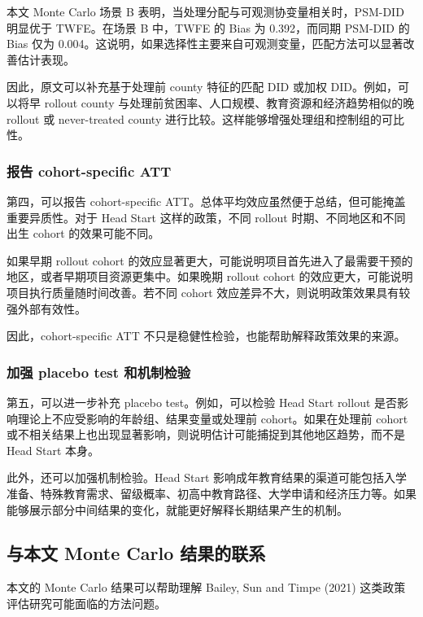 \documentclass[
  fontset=windows]{ctexart}
\begin{document}
本文 Monte Carlo 场景 B 表明，当处理分配与可观测协变量相关时，PSM-DID
明显优于 TWFE。在场景 B 中，TWFE 的 Bias 为 0.392，而同期 PSM-DID 的
Bias 仅为
0.004。这说明，如果选择性主要来自可观测变量，匹配方法可以显著改善估计表现。

因此，原文可以补充基于处理前 county 特征的匹配 DID 或加权
DID。例如，可以将早 rollout county
与处理前贫困率、人口规模、教育资源和经济趋势相似的晚 rollout 或
never-treated county 进行比较。这样能够增强处理组和控制组的可比性。

\subsubsection{报告 cohort-specific
ATT}\label{ux62a5ux544a-cohort-specific-att}

第四，可以报告 cohort-specific
ATT。总体平均效应虽然便于总结，但可能掩盖重要异质性。对于 Head Start
这样的政策，不同 rollout 时期、不同地区和不同出生 cohort
的效果可能不同。

如果早期 rollout cohort
的效应显著更大，可能说明项目首先进入了最需要干预的地区，或者早期项目资源更集中。如果晚期
rollout cohort 的效应更大，可能说明项目执行质量随时间改善。若不同 cohort
效应差异不大，则说明政策效果具有较强外部有效性。

因此，cohort-specific ATT 不只是稳健性检验，也能帮助解释政策效果的来源。

\subsubsection{加强 placebo test
和机制检验}\label{ux52a0ux5f3a-placebo-test-ux548cux673aux5236ux68c0ux9a8c}

第五，可以进一步补充 placebo test。例如，可以检验 Head Start rollout
是否影响理论上不应受影响的年龄组、结果变量或处理前 cohort。如果在处理前
cohort
或不相关结果上也出现显著影响，则说明估计可能捕捉到其他地区趋势，而不是
Head Start 本身。

此外，还可以加强机制检验。Head Start
影响成年教育结果的渠道可能包括入学准备、特殊教育需求、留级概率、初高中教育路径、大学申请和经济压力等。如果能够展示部分中间结果的变化，就能更好解释长期结果产生的机制。

\subsection{与本文 Monte Carlo
结果的联系}\label{ux4e0eux672cux6587-monte-carlo-ux7ed3ux679cux7684ux8054ux7cfb}

本文的 Monte Carlo 结果可以帮助理解 Bailey, Sun and Timpe (2021)
这类政策评估研究可能面临的方法问题。
\end{document}
